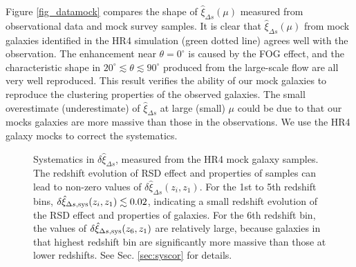 \documentclass[iop]{emulateapj}
\begin{document}

Figure \ref{fig_datamock}  compares the shape of $\hat\xi_{\Delta s}(\mu)$ measured from observational data and mock survey samples.
It is clear that $\hat \xi_{\Delta s}(\mu)$ from mock galaxies identified in the HR4 simulation (green dotted line) agrees well with the observation.
The enhancement near $\theta=0^\circ$ is caused by the FOG effect,
and the characteristic shape in $20^\circ\lesssim\theta\lesssim90^\circ$ 
produced from the large-scale flow
are all very well reproduced.
This result verifies the ability of our mock galaxies to reproduce the clustering properties of the observed galaxies.
The small overestimate (underestimate) of $\hat\xi_{\Delta s}$ at large (small) $\mu$ could be due to 
that our mocks galaxies are more massive than those in the observations.
We use the HR4 galaxy mocks to correct the systematics.

\begin{figure}
   \caption{\label{fig_sys}
   Systematics in $\delta \hat \xi_{\Delta s}$, measured from the HR4 mock galaxy samples.
   The redshift evolution of RSD effect and properties of samples can lead to non-zero values of $\delta \hat\xi_{\Delta s}(z_i,z_1)$.
   For the 1st to 5th redshift bins, $\delta\hat\xi_{\Delta s, \rm sys}(z_i,z_1)\lesssim0.02$,
    indicating a small redshift evolution of the RSD effect and properties of galaxies.
   For the 6th redshift bin, the values of $\delta\hat\xi_{\Delta s, \rm sys}(z_6,z_1)$ are relatively large,
   because galaxies in that highest redshift bin are significantly more massive than those at lower redshifts.
   See Sec. \ref{sec:syscor} for details.
   }
\end{figure}
\end{document}
